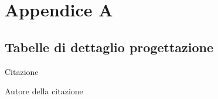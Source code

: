
\chapter{Appendice A}
\section{Tabelle di dettaglio progettazione}

\epigraph{Citazione}{Autore della citazione}



